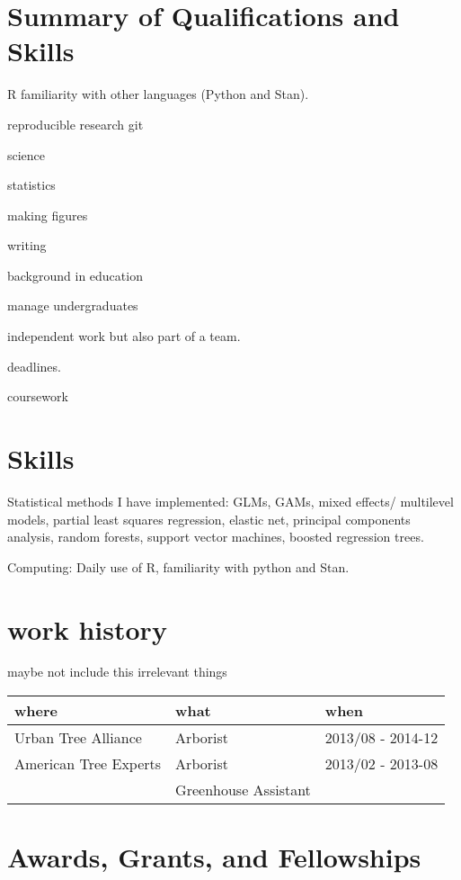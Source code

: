 \documentclass{article}
\begin{document}
\section*{Summary of Qualifications and Skills}
\label{sec:org9531469}

R
familiarity with other languages (Python and Stan).

reproducible research git

science

statistics

making figures

writing

background in education

manage undergraduates

independent work but also part of a team.

deadlines.

coursework

\section*{Skills}
\label{sec:org8768f75}
Statistical methods I have implemented: GLMs, GAMs, mixed effects/
multilevel models, partial least squares regression, elastic net, principal
components analysis, random forests, support vector machines, boosted
regression trees.

Computing: Daily use of R, familiarity with python and Stan.


\section*{work history}
\label{sec:org8ac1cb8}

maybe not include this irrelevant things

\begin{center}
\begin{tabular}{lll}
where & what & when\\
\hline
Urban Tree Alliance & Arborist & 2013/08 - 2014-12\\
American Tree Experts & Arborist & 2013/02 - 2013-08\\
 & Greenhouse Assistant & \\
\end{tabular}
\end{center}


\section*{Awards, Grants, and Fellowships}
\label{sec:org7bbf127}
\end{document}
